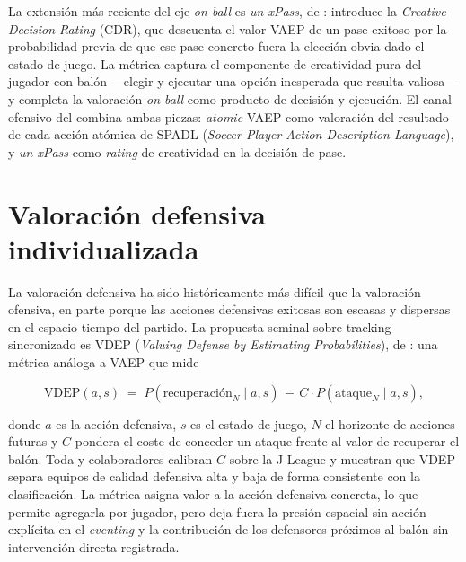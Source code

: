 La extensión más reciente del eje \textit{on-ball} es \textit{un-xPass},
de \textcite{Robberechts2023unxPass}: introduce la \textit{Creative
Decision Rating} (CDR), que descuenta el valor VAEP de un pase
exitoso por la probabilidad previa de que ese pase concreto fuera la
elección obvia dado el estado de juego. La métrica captura el
componente de creatividad pura del jugador con balón ---elegir y
ejecutar una opción inesperada que resulta valiosa--- y completa la
valoración \textit{on-ball} como producto de decisión y ejecución. El
canal ofensivo del \CCV combina ambas piezas: \textit{atomic}-VAEP
como valoración del resultado de cada acción atómica de SPADL
(\textit{Soccer Player Action Description Language}), y
\textit{un-xPass} como \textit{rating} de creatividad en la decisión
de pase.


\section{Valoración defensiva individualizada}
\label{sec:sota-defensa}

La valoración defensiva ha sido históricamente más difícil que la
valoración ofensiva, en parte porque las acciones defensivas exitosas
son escasas y dispersas en el espacio-tiempo del partido. La propuesta
seminal sobre tracking sincronizado es VDEP (\textit{Valuing Defense
by Estimating Probabilities}), de \textcite{Toda2022VDEP}: una métrica
análoga a VAEP que mide

\[
\text{VDEP}(a, s) \;=\; P(\text{recuperación}_N \mid a, s) \,-\, C \cdot P(\text{ataque}_N \mid a, s),
\]

donde $a$ es la acción defensiva, $s$ es el estado de juego, $N$ el
horizonte de acciones futuras y $C$ pondera el coste de conceder un
ataque frente al valor de recuperar el balón. Toda y colaboradores
calibran $C$ sobre la J-League y muestran que VDEP separa equipos de
calidad defensiva alta y baja de forma consistente con la clasificación.
La métrica asigna valor a la acción defensiva concreta, lo que permite
agregarla por jugador, pero deja fuera la presión espacial sin acción
explícita en el \textit{eventing} y la contribución de los defensores
próximos al balón sin intervención directa registrada.

